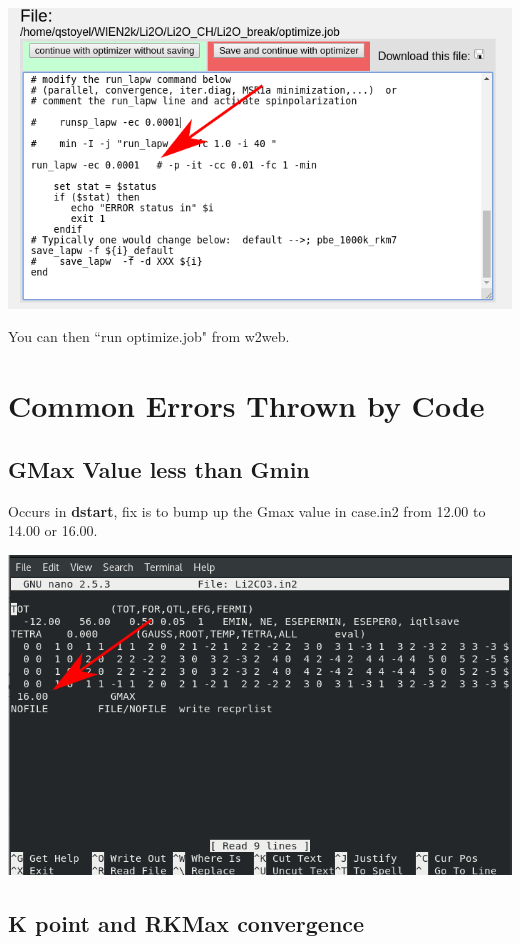 \documentclass[12pt]{article}
\begin{document}
\includegraphics[scale=0.4]{./images/vol_opt2.png}

You can then ``run optimize.job" from w2web.



\section{Common Errors Thrown by Code}

\subsection{GMax Value less than Gmin}

Occurs in \textbf{dstart}, fix is to bump up the Gmax value in case.in2 from 12.00 to 14.00 or 16.00.

\includegraphics[scale=0.5]{./images/gmax_err.png}


\subsection{K point and RKMax convergence}
\end{document}
